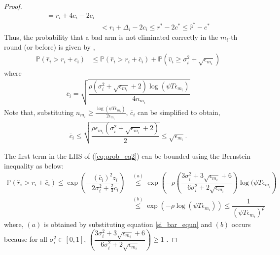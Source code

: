 \begin{proof}
\begin{align*}
= r_{i} + 4c_{i} - 2c_{i} \\
 &< r_{i} + \Delta_{i} - 2c_{i}
 \leq r^{*} -2c^{*} 
 \leq \hat{r}^{*} - c^{*}
  \end{align*}
	\noindent
	Thus, the probability that a bad arm is not eliminated correctly in the $m_i$-th round (or before) is given by ,
\begin{align}
\mathbb{P}(\hat{r}_{i}> r_{i} + c_{i})
&\leq \mathbb{P}\left( \hat{r}_{i} > r_{i}+ \bar{c}_i\right) 
+ \mathbb{P}\left( \hat{v}_{i}\geq \sigma_{i}^{2}+\sqrt{\epsilon_{m_{i}}}\right)\label{eq:prob_eq2}
\end{align}
where 
\begin{align*}
\bar{c}_i=\sqrt{\dfrac{\rho (\sigma_{i}^{2}+\sqrt{\epsilon_{m_{i}}} + 2)\log(\psi T\epsilon_{m_{i}})}{4n_{m_i}}}
\end{align*}
Note that, substituting $ n_{m_i} \geq \frac{\log{(\psi T\epsilon_{m_{i}})}}{2\epsilon_{m_{i}}}$, $\bar{c}_i$ can be simplified to obtain,
\begin{align}
\bar{c}_i
\leq \sqrt{\dfrac{\rho\epsilon_{m_{i}}(\sigma_{i}^{2}+\sqrt{\epsilon_{m_{i}}} + 2)}{2}}\leq \sqrt{ \epsilon_{m_{i}}}.
\label{si_bar_equn}
\end{align}

The first term in the LHS of (\ref{eq:prob_eq2}) can be bounded using the Bernstein inequality as below:
\begin{align}
\mathbb{P}\left( \hat{r}_{i} > r_{i}+ \bar{c}_i\right)\nonumber 
\le \exp\left(- \dfrac{(\bar{c}_i)^2 z_{i}}{2\sigma_i^2 + \frac{2}{3}\bar{c}_i} \right)\nonumber 
& \overset{(a)}{\le} \exp\left(- \rho \left(\dfrac{3\sigma_{i}^{2}+3\sqrt{\epsilon_{m_{i}}} + 6}{6\sigma_i^2 + 2\sqrt{\epsilon_{m_i}}} \right)\log(\psi  T\epsilon_{m_{i}}\right)\nonumber \\
& \overset{(b)}{\leq} \exp\left(- \rho \log(\psi  T\epsilon_{m_{i}})\right) 
\le \dfrac{1}{(\psi  T\epsilon_{m_{i}})^{\rho}}
\label{lhs1_equn}
\end{align}
where, $(a)$ is obtained by substituting equation \ref{si_bar_equn} and $(b)$ occurs because for all $\sigma_{i}^2 \in [0,1]$, $\left(\dfrac{3\sigma_{i}^{2}+3\sqrt{\epsilon_{m_{i}}} + 6}{6\sigma_i^2 + 2\sqrt{\epsilon_{m_i}}}\right) \geq 1$ .


\end{proof}
